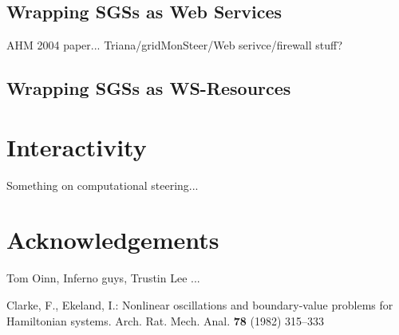 \documentclass{llncs}
\begin{document}
\subsection{Wrapping SGSs as Web Services}
AHM 2004 paper...
Triana/gridMonSteer/Web serivce/firewall stuff?

\subsection{Wrapping SGSs as WS-Resources}




%

\section{Interactivity} \label{sec:interactivity}

Something on computational steering...

\section*{Acknowledgements}
Tom Oinn, Inferno guys, Trustin Lee ...
%
%
\begin{thebibliography}{refs}
%
%
Clarke, F., Ekeland, I.:
Nonlinear oscillations and
boundary-value problems for Hamiltonian systems.
Arch. Rat. Mech. Anal. {\bf 78} (1982) 315--333

\end{thebibliography}
\end{document}

